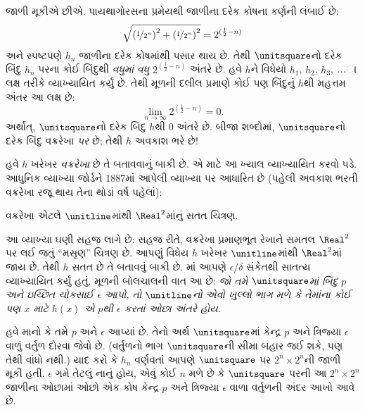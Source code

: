 જાળી મૂકીએ છીએ.
પાયથાગોરસના પ્રમેયથી
જાળીના દરેક કોષના
કર્ણની લંબાઈ છે:
\[
\sqrt{\left(\nicefrac{1}{2^{n}}\right)^2+\left(\nicefrac{1}{2^{n}}\right)^2} = 2^{(\frac{1}{2}-n)}
\]
અને સ્પષ્ટપણે $h_n$
જાળીના દરેક કોષમાંથી
પસાર થાય છે. તેથી
$\unitsquare$નો દરેક
બિંદુ $h_n$ પરના
કોઈ બિંદુથી \emph{વધુમાં વધુ}
$2^{(\frac{1}{2}-n)}$
અંતરે છે. હવે $h$ને
વિધેયો $h_1$, $h_2$,
$h_3$, \dots{}ા લક્ષ
તરીકે વ્યાખ્યાયિત કર્યું છે.
તેથી મૂળની દલીલ પ્રમાણે
કોઈ પણ બિંદુનું $h$થી
મહત્તમ અંતર આ લક્ષ છે:
\[
\lim_{n \rightarrow \infty} 2^{(\frac{1}{2}-n)} = 0.
\]
અર્થાત્, $\unitsquare$નો
દરેક બિંદુ $h$થી
$0$ અંતરે છે. બીજા
શબ્દોમાં, $\unitsquare$નો
દરેક બિંદુ વક્રરેખા
\emph{પર} છે; તેથી
$h$ અવકાશ ભરે છે!{}

હવે $h$ ખરેખર
\emph{વક્રરેખા} છે
તે બતાવવાનું બાકી છે.
એ માટે આ ખ્યાલ
વ્યાખ્યાયિત કરવો પડે.
આધુનિક વ્યાખ્યા
જોર્ડને 1887માં
આપેલી વ્યાખ્યા
પર આધારિત છે
(પહેલી અવકાશ ભરતી
વક્રરેખા રજૂ થાય
તેના થોડાં વર્ષ પહેલાં):

\begin{defn}
વક્રરેખા એટલે
$\unitline$માંથી
$\Real^2$માંનું
સતત ચિત્રણ.
\end{defn}

આ વ્યાખ્યા ઘણી સહજ
લાગે છે: સહજ રીતે,
વક્રરેખા પ્રમાણભૂત
રેખાને સમતલ
$\Real^2$ પર લઈ
જતું “મસૃણ” ચિત્રણ
છે. આપણું વિધેય
$h$ ખરેખર
$\unitline$માંથી
$\Real^2$માં જાય છે.
તેથી $h$ સતત
છે તે બતાવવું બાકી છે.
માં
આપણે $\epsilon$/$\delta$
સંકેતથી સાતત્ય
વ્યાખ્યાયિત કર્યું હતું.
મૂળની બોલચાલની
વાત આ છે:
\emph{જો તમે $\unitsquare$માં
બિંદુ $p$ અને ઇચ્છિત
ચોકસાઈ $\epsilon$ આપો,
તો $\unitline$નો એવો
ખુલ્લો ભાગ મળે કે
તેમાંના કોઈ પણ $x$
માટે $h(x)$ એ $p$થી
$\epsilon$ કરતાં ઓછા
અંતરે હોય.}

હવે માનો કે તમે
$p$ અને $\epsilon$
આપ્યાં છે. તેનો
અર્થ $\unitsquare$માં
કેન્દ્ર $p$ અને
ત્રિજ્યા $\epsilon$
વાળું વર્તુળ દોરવા
જેવો છે. (વર્તુળનો
ભાગ $\unitsquare$ની
સીમા બહાર જઈ શકે,
પણ તેથી વાંધો નથી.)
યાદ કરો કે $h_n$
વર્ણવતાં આપણે
$\unitsquare$ પર
$2^n \times 2^n$ની
જાળી મૂકી હતી.
$\epsilon$ ગમે તેટલું
નાનું હોય, એવું
કોઈ $n$ મળે છે કે
$\unitsquare$ પરની આ
$2^n \times 2^n$ જાળીના ઓછામાં
ઓછો એક કોષ
કેન્દ્ર $p$ અને
ત્રિજ્યા $\epsilon$
વાળા વર્તુળની
અંદર આખો આવે છે.

